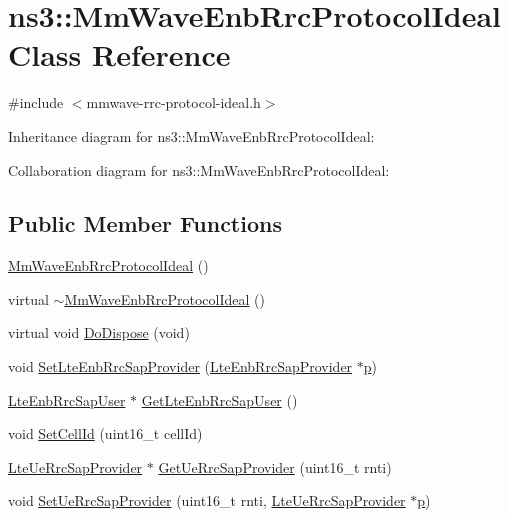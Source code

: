 \hypertarget{classns3_1_1MmWaveEnbRrcProtocolIdeal}{}\section{ns3\+:\+:Mm\+Wave\+Enb\+Rrc\+Protocol\+Ideal Class Reference}
\label{classns3_1_1MmWaveEnbRrcProtocolIdeal}


{\ttfamily \#include $<$mmwave-\/rrc-\/protocol-\/ideal.\+h$>$}



Inheritance diagram for ns3\+:\+:Mm\+Wave\+Enb\+Rrc\+Protocol\+Ideal\+:


Collaboration diagram for ns3\+:\+:Mm\+Wave\+Enb\+Rrc\+Protocol\+Ideal\+:
\subsection*{Public Member Functions}
\begin{DoxyCompactItemize}
\item 
\hyperlink{classns3_1_1MmWaveEnbRrcProtocolIdeal_a11d99f5658909e8d544afe8d5fbf0080}{Mm\+Wave\+Enb\+Rrc\+Protocol\+Ideal} ()
\item 
virtual \hyperlink{classns3_1_1MmWaveEnbRrcProtocolIdeal_a9a223108d035c3f23ec253119666e78f}{$\sim$\+Mm\+Wave\+Enb\+Rrc\+Protocol\+Ideal} ()
\item 
virtual void \hyperlink{classns3_1_1MmWaveEnbRrcProtocolIdeal_afcecdd4efc8e95a50fa2c2217a84145d}{Do\+Dispose} (void)
\item 
void \hyperlink{classns3_1_1MmWaveEnbRrcProtocolIdeal_ab5b79447ed9b86047dbadef6d8b6a2a5}{Set\+Lte\+Enb\+Rrc\+Sap\+Provider} (\hyperlink{classns3_1_1LteEnbRrcSapProvider}{Lte\+Enb\+Rrc\+Sap\+Provider} $\ast$\hyperlink{lte__link__budget__x2__handover__measures_8m_ac9de518908a968428863f829398a4e62}{p})
\item 
\hyperlink{classns3_1_1LteEnbRrcSapUser}{Lte\+Enb\+Rrc\+Sap\+User} $\ast$ \hyperlink{classns3_1_1MmWaveEnbRrcProtocolIdeal_ad9c6fb878b946eaf6a7b50d5194853fe}{Get\+Lte\+Enb\+Rrc\+Sap\+User} ()
\item 
void \hyperlink{classns3_1_1MmWaveEnbRrcProtocolIdeal_a4a27ed8d606697a57d7a5d2190d8de72}{Set\+Cell\+Id} (uint16\+\_\+t cell\+Id)
\item 
\hyperlink{classns3_1_1LteUeRrcSapProvider}{Lte\+Ue\+Rrc\+Sap\+Provider} $\ast$ \hyperlink{classns3_1_1MmWaveEnbRrcProtocolIdeal_ac094d95c7f7e141e665a2523369f57bc}{Get\+Ue\+Rrc\+Sap\+Provider} (uint16\+\_\+t rnti)
\item 
void \hyperlink{classns3_1_1MmWaveEnbRrcProtocolIdeal_aba5a217a00de79faf28d56cda7e93ce1}{Set\+Ue\+Rrc\+Sap\+Provider} (uint16\+\_\+t rnti, \hyperlink{classns3_1_1LteUeRrcSapProvider}{Lte\+Ue\+Rrc\+Sap\+Provider} $\ast$\hyperlink{lte__link__budget__x2__handover__measures_8m_ac9de518908a968428863f829398a4e62}{p})
\end{DoxyCompactItemize}

